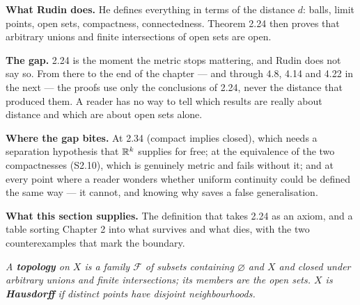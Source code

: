 \begin{roadmap}
\raggedright
\textbf{What Rudin does.} He defines everything in terms of the distance
$d$: balls, limit points, open sets, compactness, connectedness. Theorem
2.24 then proves that arbitrary unions and finite intersections of open sets
are open.

\smallskip
\textbf{The gap.} 2.24 is the moment the metric stops mattering, and Rudin
does not say so. From there to the end of the chapter --- and through 4.8,
4.14 and 4.22 in the next --- the proofs use only the conclusions of 2.24,
never the distance that produced them. A reader has no way to tell which
results are really about distance and which are about open sets alone.

\smallskip
\textbf{Where the gap bites.} At 2.34 (compact implies closed), which needs a
separation hypothesis that $\mathbb{R}^k$ supplies for free; at the equivalence of
the two compactnesses (S2.10), which is genuinely metric and fails without
it; and at every point where a reader wonders whether uniform continuity
could be defined the same way --- it cannot, and knowing why saves a false
generalisation.

\smallskip
\textbf{What this section supplies.} The definition that takes 2.24 as an
axiom, and a table sorting Chapter 2 into what survives and what dies, with
the two counterexamples that mark the boundary.
\end{roadmap}

\emph{A \textbf{topology} on $X$ is a family $\mathcal F$ of subsets
containing $\varnothing$ and $X$ and closed under arbitrary unions and finite
intersections; its members are the open sets. $X$ is \textbf{Hausdorff} if
distinct points have disjoint neighbourhoods.}

